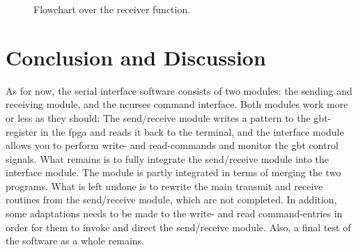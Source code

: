 \documentclass[main.tex]{subfiles}
\begin{document}
\begin{figure}[H] %
\begin{center}
\resizebox{0.7\linewidth}{!}{}
\caption{Flowchart over the receiver function.}
\label{fig:flowrx}
\end{center}
\end{figure}


\section{Conclusion and Discussion}

As for now, the serial interface software consists of two modules: the sending and receiving module, and the ncurses command interface. Both modules work  more or less as they should: The send/receive module writes a pattern to the \gls{gbt}-register in the \gls{fpga} and reads it back to the terminal, and the interface module allows you to perform write- and read-commands and monitor the \gls{gbt} control signals. What remains is to fully integrate the send/receive module into the interface module. The module is partly integrated in terms of merging the two programs. What is left undone is to rewrite the main transmit and receive routines from the send/receive module, which are not completed. In addition, some adaptations needs to be made to the write- and read command-entries in order for them to invoke and direct the send/receive module. Also, a final test of the software as a whole remains.


\end{document}
